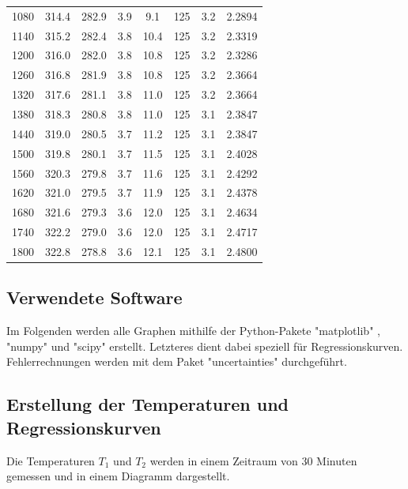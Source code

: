 \begin{table}[H]
\begin{tabular}{c c c c c c c c}
    1080  &  314.4 &  282.9 & 3.9  &  9.1 & 125 & 3.2 & 2.2894 \\
    1140  &  315.2 &  282.4 & 3.8  & 10.4 & 125 & 3.2 & 2.3319 \\
    1200  &  316.0 &  282.0 & 3.8  & 10.8 & 125 & 3.2 & 2.3286 \\
    1260  &  316.8 &  281.9 & 3.8  & 10.8 & 125 & 3.2 & 2.3664 \\
    1320  &  317.6 &  281.1 & 3.8  & 11.0 & 125 & 3.2 & 2.3664 \\
    1380  &  318.3 &  280.8 & 3.8  & 11.0 & 125 & 3.1 & 2.3847 \\
    1440  &  319.0 &  280.5 & 3.7  & 11.2 & 125 & 3.1 & 2.3847 \\
    1500  &  319.8 &  280.1 & 3.7  & 11.5 & 125 & 3.1 & 2.4028 \\
    1560  &  320.3 &  279.8 & 3.7  & 11.6 & 125 & 3.1 & 2.4292 \\
    1620  &  321.0 &  279.5 & 3.7  & 11.9 & 125 & 3.1 & 2.4378 \\
    1680  &  321.6 &  279.3 & 3.6  & 12.0 & 125 & 3.1 & 2.4634 \\
    1740  &  322.2 &  279.0 & 3.6  & 12.0 & 125 & 3.1 & 2.4717 \\
    1800  &  322.8 &  278.8 & 3.6  & 12.1 & 125 & 3.1 & 2.4800 \\
    \bottomrule
  \end{tabular}
\end{table}

\subsection{Verwendete Software}
Im Folgenden werden alle Graphen mithilfe der Python-Pakete "matplotlib" \cite{matplotlib},
"numpy" \cite{numpy} und "scipy" \cite{scipy} erstellt. Letzteres dient dabei
speziell für Regressionskurven. \\
Fehlerrechnungen werden mit dem Paket "uncertainties" \cite{uncertainties} durchgeführt.

\subsection{Erstellung der Temperaturen und Regressionskurven}
Die Temperaturen $T_1$ und $T_2$ werden in einem Zeitraum von 30 Minuten gemessen und in einem Diagramm dargestellt.

